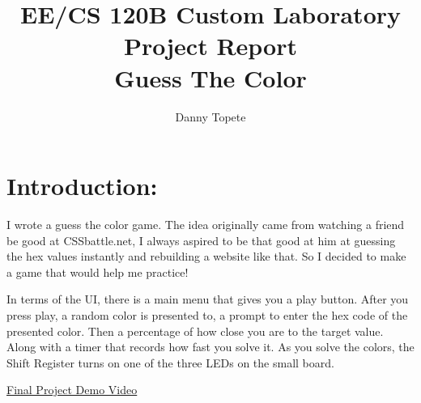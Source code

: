 \documentclass[12pt]{article}
\begin{document}

\title{EE/CS 120B Custom Laboratory Project Report\\
Guess The Color}
\author{Danny Topete}

\maketitle

\doublespacing

\section{Introduction:}
I wrote a guess the color game. The idea originally came from watching a friend 
be good at CSSbattle.net,
I always aspired to be that good at him at guessing the hex values instantly and rebuilding a website like that.
So I decided to make a game that would help me practice!

In terms of the UI, there is a main menu that gives you a play button. After you press play,
a random color is presented to, a prompt to enter the
hex code of the presented color. Then a percentage
of how close you are to the target value. Along with
a timer that records how fast you solve it.
As you solve the colors, the Shift Register turns on one of the
three LEDs on the small board.

\href{https://youtu.be/q6jeuhIvPzk}{Final Project Demo Video}

\pagebreak
\end{document}
